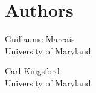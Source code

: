 \documentclass[english]{article}
\begin{document}
\section{Authors}
\noindent
Guillaume Marcais \\
University of Maryland \\

Carl Kingsford \\
University of Maryland \\

\LatexManEnd
\end{document}

